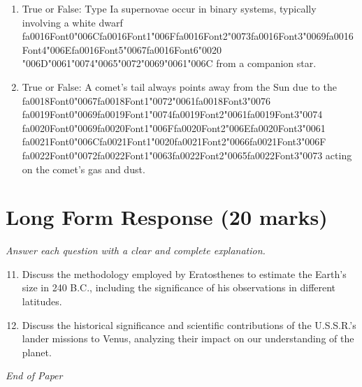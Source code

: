 \documentclass[12pt]{article}
\begin{document}
\begin{enumerate}[label=\arabic*.]
\item True or False: Type Ia supernovae occur in binary systems, typically involving a white dwarf {\csname fa0016Font0\endcsname\char"006C}{\csname fa0016Font1\endcsname\char"006F}{\csname fa0016Font2\endcsname\char"0073}{\csname fa0016Font3\endcsname\char"0069}{\csname fa0016Font4\endcsname\char"006E}{\csname fa0016Font5\endcsname\char"0067}{\csname fa0016Font6\endcsname\char"0020} {\char"006D}{\char"0061}{\char"0074}{\char"0065}{\char"0072}{\char"0069}{\char"0061}{\char"006C} from a companion star.
\item True or False: A comet's tail always points away from the Sun due to the {\csname fa0018Font0\endcsname\char"0067}{\csname fa0018Font1\endcsname\char"0072}{\char"0061}{\csname fa0018Font3\endcsname\char"0076} {\csname fa0019Font0\endcsname\char"0069}{\csname fa0019Font1\endcsname\char"0074}{\csname fa0019Font2\endcsname\char"0061}{\csname fa0019Font3\endcsname\char"0074} {\csname fa0020Font0\endcsname\char"0069}{\csname fa0020Font1\endcsname\char"006F}{\csname fa0020Font2\endcsname\char"006E}{\csname fa0020Font3\endcsname\char"0061} {\csname fa0021Font0\endcsname\char"006C}{\csname fa0021Font1\endcsname\char"0020}{\csname fa0021Font2\endcsname\char"0066}{\csname fa0021Font3\endcsname\char"006F} {\csname fa0022Font0\endcsname\char"0072}{\csname fa0022Font1\endcsname\char"0063}{\csname fa0022Font2\endcsname\char"0065}{\csname fa0022Font3\endcsname\char"0073} acting on the comet's gas and dust.
\end{enumerate}

\section*{Long Form Response (20 marks)}
\textit{Answer each question with a clear and complete explanation.}
\begin{enumerate}[label=\arabic*.]
\setcounter{enumi}{10}
\item Discuss the methodology employed by Eratosthenes to estimate the Earth's size in 240 B.C.,
including the significance of his observations in different latitudes.
\item Discuss the historical significance and scientific contributions of the U.S.S.R.'s lander
missions to Venus, analyzing their impact on our understanding of the planet.
\end{enumerate}

\vfill
\noindent\textit{End of Paper}
\end{document}

